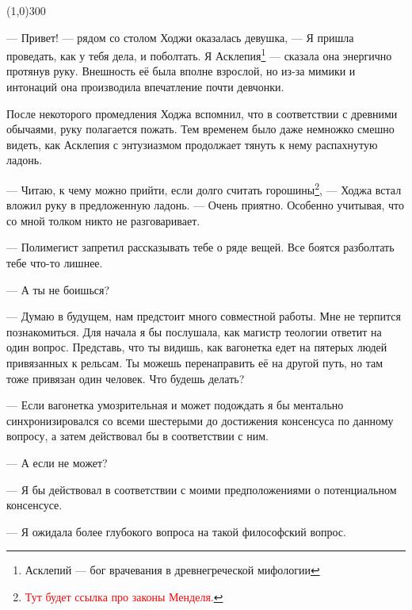 \documentclass[12pt,a4paper]{article}
\newcommand{\tr}[1]{\textcolor{red}{#1}}
\newcommand{\todo}[1]{\marginpar{\scriptsize \tr{#1}}}
\newcommand{\sep}{
	\begin{center}
		\line(1,0){300}
	\end{center}
}
\begin{document}



\sep

--- Привет! --- рядом со столом Ходжи оказалась девушка, --- Я пришла проведать, как у тебя дела, и поболтать. Я Асклепия\footnote{Асклепий --- бог врачевания в древнегреческой мифологии} --- сказала она энергично протянув руку. Внешность её была вполне взрослой, но из-за мимики и интонаций она производила впечатление почти девчонки.

После некоторого промедления Ходжа вспомнил, что в соответствии с древними обычаями, руку полагается пожать. Тем временем было даже немножко смешно видеть, как Асклепия с энтузиазмом продолжает тянуть к нему распахнутую ладонь.

--- Читаю, к чему можно прийти, если долго считать горошины\footnote{\tr{Тут будет ссылка про законы Менделя.}}, --- Ходжа встал вложил руку в предложенную ладонь. --- Очень приятно. Особенно учитывая, что со мной толком никто не разговаривает.

--- Полимегист запретил рассказывать тебе о ряде вещей. Все боятся разболтать тебе что-то лишнее.

--- А ты не боишься?

--- Думаю в будущем, нам предстоит много совместной работы. Мне не терпится познакомиться. Для начала я бы послушала, как магистр теологии ответит на один вопрос. \todo{фентезийная, но узнаваемая версия дилеммы вагонетки} Представь, что ты видишь, как вагонетка едет на пятерых людей привязанных к рельсам. Ты можешь перенаправить её на другой путь, но там тоже привязан один человек. Что будешь делать?

--- Если вагонетка умозрительная и может подождать я бы ментально синхронизировался со всеми шестерыми до достижения консенсуса по данному вопросу, а затем действовал бы в соответствии с ним.

--- А если не может?

--- Я бы действовал в соответствии с моими предположениями о потенциальном консенсусе.


--- Я ожидала более глубокого вопроса на такой философский вопрос.
\end{document}
